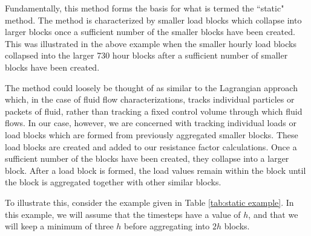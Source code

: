 \documentclass[review,12pt]{elsarticle}
\begin{document}
Fundamentally, this method forms the basis for what is termed the ``static" method. The method is characterized by smaller load blocks which collapse into larger blocks once a sufficient number of the smaller blocks have been created. This was illustrated in the above example when the smaller hourly load blocks collapsed into the larger 730 hour blocks after a sufficient number of smaller blocks have been created. 

The method could loosely be thought of as similar to the Lagrangian approach which, in the case of fluid flow characterizations, tracks individual particles or packets of fluid, rather than tracking a fixed control volume through which fluid flows. In our case, however, we are concerned with tracking individual loads or load blocks which are formed from previously aggregated smaller blocks. These load blocks are created and added to our resistance factor calculations. Once a sufficient number of the blocks have been created, they collapse into a larger block. After a load block is formed, the load values remain within the block until the block is aggregated together with other similar blocks.

To illustrate this, consider the example given in Table \ref{tab:static example}. In this example, we will assume that the timesteps have a value of $h$, and that we will keep a minimum of three $h$ before aggregating into $2h$ blocks.
\end{document}
